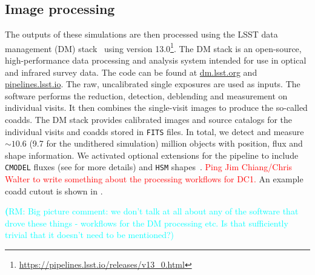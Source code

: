 \documentclass[twocolumn]{aastex62}
\newcommand{\rachel}[1]{{\textcolor{cyan}{{\textbf (RM: #1)}}}}
\begin{document}


\subsection{Image processing}
\label{sec:image_processing_pipeline}

The outputs of these simulations are then processed using the LSST data management (DM) stack~\citep{Overview,ScienceBook,WhitePaper,2017arXiv170506766B,2015arXiv151207914J} using version 13.0\footnote{\url{https://pipelines.lsst.io/releases/v13_0.html}}. The DM stack is an open-source, high-performance data processing and analysis system intended for use in optical and infrared survey data. The code can be found at \url{dm.lsst.org} and \url{pipelines.lsst.io}. The raw, uncalibrated single exposures are used as inputs. The software performs the reduction, detection, deblending and measurement on individual visits. It then combines the single-visit images to produce the so-called coadds. The DM stack provides calibrated images and source catalogs for the individual visits and coadds stored in \texttt{FITS} files. In total, we detect and measure $\sim 10.6$ (9.7 for the undithered simulation) million objects with position, flux and shape information. We activated optional extensions for the pipeline to include \texttt{CMODEL} fluxes (see \cite{2017arXiv170506766B} for more details) and \texttt{HSM} shapes~\citep{2003MNRAS.343..459H,2005MNRAS.361.1287M}.
\textcolor{red}{Ping Jim Chiang/Chris Walter to write something about the processing workflows for DC1.}
An example coadd cutout is shown in .

\rachel{Big picture comment: we don't talk at all about any of the software that drove these things - workflows for the DM processing etc.  Is that sufficiently trivial that it doesn't need to be mentioned?}
\end{document}
